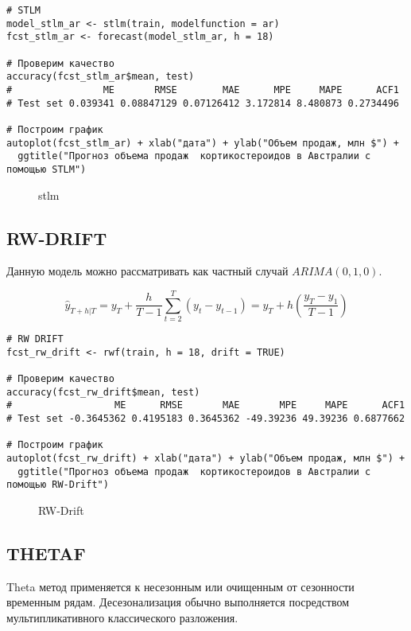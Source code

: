 \documentclass[a4paper,12pt]{article}
\theoremstyle{plain} %
\theoremstyle{definition} %
\theoremstyle{remark} %
\begin{document}
\begin{verbatim}
# STLM
model_stlm_ar <- stlm(train, modelfunction = ar)
fcst_stlm_ar <- forecast(model_stlm_ar, h = 18)

# Проверим качество
accuracy(fcst_stlm_ar$mean, test)
#                ME       RMSE        MAE      MPE     MAPE      ACF1
# Test set 0.039341 0.08847129 0.07126412 3.172814 8.480873 0.2734496

# Построим график
autoplot(fcst_stlm_ar) + xlab("дата") + ylab("Объем продаж, млн $") +
  ggtitle("Прогноз объема продаж  кортикостероидов в Австралии с помощью STLM")
\end{verbatim}

\begin{figure}[H]
  \noindent{}
  \caption{stlm}
  \label{figCurves}
\end{figure}

\subsection{RW-DRIFT}
Данную модель можно рассматривать как частный случай $ARIMA(0,1,0)$.


\[
\hat{y}_{T+h|T} = y_{T} + \frac{h}{T-1}\sum_{t=2}^T (y_{t}-y_{t-1}) = y_{T} + h \left( \frac{y_{T} -y_{1}}{T-1}\right)
\]

\begin{verbatim}
# RW DRIFT
fcst_rw_drift <- rwf(train, h = 18, drift = TRUE)

# Проверим качество
accuracy(fcst_rw_drift$mean, test)
#                  ME      RMSE       MAE       MPE     MAPE      ACF1
# Test set -0.3645362 0.4195183 0.3645362 -49.39236 49.39236 0.6877662

# Построим график
autoplot(fcst_rw_drift) + xlab("дата") + ylab("Объем продаж, млн $") +
  ggtitle("Прогноз объема продаж  кортикостероидов в Австралии с помощью RW-Drift")
\end{verbatim}

\begin{figure}[H]
  \noindent{}
  \caption{RW-Drift}
\end{figure}

\subsection{THETAF}

Theta метод применяется к несезонным или очищенным от сезонности временным рядам.
Десезонализация обычно выполняется посредством мультипликативного классического разложения.
\end{document}
